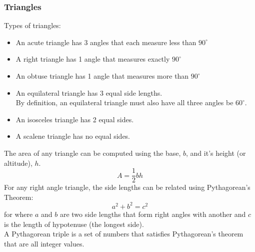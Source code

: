 \subsubsection{Triangles}
Types of triangles:
\begin{itemize}
    \item An acute triangle has 3 angles that each measure less than $90^\circ$
    \item A right triangle has 1 angle that measures exactly $90^\circ$
    \item An obtuse triangle has 1 angle that measures more than $90^\circ$
    \item An equilateral triangle has 3 equal side lengths.\\
    By definition, an equilateral triangle must also have all three angles be $60^\circ$.
    \item An isosceles triangle has 2 equal sides.
    \item A scalene triangle has no equal sides.
\end{itemize}
The area of any triangle can be computed using the base, $b$, and it's height (or altitude), $h$.
$$A=\frac{1}{2}bh$$
For any right angle triangle, the side lengths can be related using Pythagorean's Theorem:
$$a^2+b^2=c^2$$
for where $a$ and $b$ are two side lengths that form right angles with another and $c$ is the length of hypotenuse (the longest side).\\
A Pythagorean triple is a set of numbers that satisfies Pythagorean's theorem that are all integer values.

